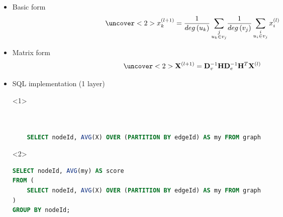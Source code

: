 \begin{itemize}
    \item Basic form
        \begin{equation*}\hspace*{-3cm}
            \uncover<2>{x_k^{(l+1)} = \frac{1}{deg\left( u_k \right)}\sum_{\substack{j \\ u_k \in v_j}}} \frac{1}{deg \left( v_j \right)}\sum_{\substack{i \\ u_i \in v_j}} x_i^{(l)}
        \end{equation*}
    \item Matrix form    
        \begin{equation*}\hspace*{-3cm}
        \uncover<2>{\X^{(l+1)} = \D^{-1} \HH} \B^{-1} \HH^T \X^{(l)}
        \end{equation*}
    \item SQL implementation (1 layer)
    \begin{onlyenv}<1>
        \begin{lstlisting}[language=SQL,basicstyle=\small]


    SELECT nodeId, AVG(X) OVER (PARTITION BY edgeId) AS my FROM graph


        \end{lstlisting}
    \end{onlyenv}
    \begin{onlyenv}<2>
        \begin{lstlisting}[language=SQL,basicstyle=\small]
SELECT nodeId, AVG(my) AS score
FROM (
    SELECT nodeId, AVG(X) OVER (PARTITION BY edgeId) AS my FROM graph
)
GROUP BY nodeId;
        \end{lstlisting}
    \end{onlyenv}
\end{itemize}


